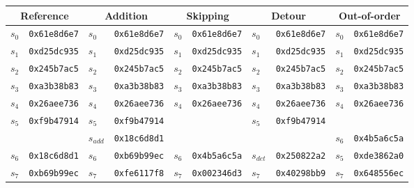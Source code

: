 \begin{table}
    \newcommand{\red}{\cellcolor{red!50}}
    \newcommand{\headersize}{\small}
    \centering
    \scriptsize
    \begin{tabularx}{\linewidth}{ll|ll|ll|ll|ll}
        \hline
        \multicolumn{2}{c|}{\headersize Reference} & \multicolumn{2}{c|}{\headersize Addition} & \multicolumn{2}{c|}{\headersize Skipping} & \multicolumn{2}{c|}{\headersize Detour} & \multicolumn{2}{c}{\headersize Out-of-order} \\
         \hline
         \hline%
         $s_0$   &\texttt{0x61e8d6e7}&$s_0$        &\texttt{0x61e8d6e7}    &$s_0$       &\texttt{0x61e8d6e7}    &$s_0$        &\texttt{0x61e8d6e7}    &$s_0$        &\texttt{0x61e8d6e7}     \\
         $s_1$   &\texttt{0xd25dc935}&$s_1$        &\texttt{0xd25dc935}    &$s_1$       &\texttt{0xd25dc935}    &$s_1$        &\texttt{0xd25dc935}    &$s_1$        &\texttt{0xd25dc935}     \\
         $s_2$   &\texttt{0x245b7ac5}&$s_2$        &\texttt{0x245b7ac5}    &$s_2$       &\texttt{0x245b7ac5}    &$s_2$        &\texttt{0x245b7ac5}    &$s_2$        &\texttt{0x245b7ac5}     \\
         $s_3$   &\texttt{0xa3b38b83}&$s_3$        &\texttt{0xa3b38b83}    &$s_3$       &\texttt{0xa3b38b83}    &$s_3$        &\texttt{0xa3b38b83}    &$s_3$        &\texttt{0xa3b38b83}     \\
         $s_4$   &\texttt{0x26aee736}&$s_4$        &\texttt{0x26aee736}    &$s_4$       &\texttt{0x26aee736}    &$s_4$        &\texttt{0x26aee736}    &$s_4$        &\texttt{0x26aee736}     \\
         $s_5$   &\texttt{0xf9b47914}&$s_5$        &\texttt{0xf9b47914}    &            &                       &$s_5$        &\texttt{0xf9b47914}    &             &                        \\
                 &                   &\red$s_{add}$&\red\texttt{0x18c6d8d1}&            &                       &             &                       &\red$s_6$    &\red\texttt{0x4b5a6c5a} \\
         $s_6$   &\texttt{0x18c6d8d1}&\red$s_6$    &\red\texttt{0xb69b99ec}&\red$s_6$   &\red\texttt{0x4b5a6c5a}&\red$s_{det}$&\red\texttt{0x250822a2}&\red$s_5$    &\red\texttt{0xde3862a0} \\
         $s_7$   &\texttt{0xb69b99ec}&\red$s_7$    &\red\texttt{0xfe6117f8}&\red$s_7$   &\red\texttt{0x002346d3}&\red$s_7$    &\red\texttt{0x40298bb9}&\red$s_7$    &\red\texttt{0x648556ec} \\

\end{tabularx}
\end{table}
